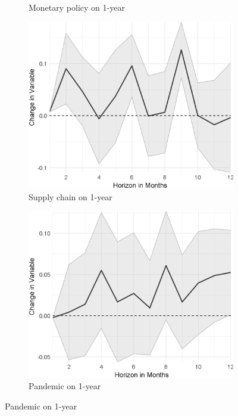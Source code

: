 \begin{figure}[H]
\begin{subfigure}{00.32\textwidth}
	\caption{Monetary policy on 1-year}
\end{subfigure}
\begin{subfigure}{00.32\textwidth}
	\includegraphics[width=1\textwidth]{output/lp/baseline/diff/supply_chain/supply_chainonexpectations1y_djn.eps}
	\caption{Supply chain on 1-year}
\end{subfigure}
\begin{subfigure}{00.32\textwidth}
	\includegraphics[width=1\textwidth]{output/lp/baseline/diff/pandemic/pandemiconexpectations1y_djn.eps}
	\caption{Pandemic on 1-year}
\end{subfigure}

\end{figure}
